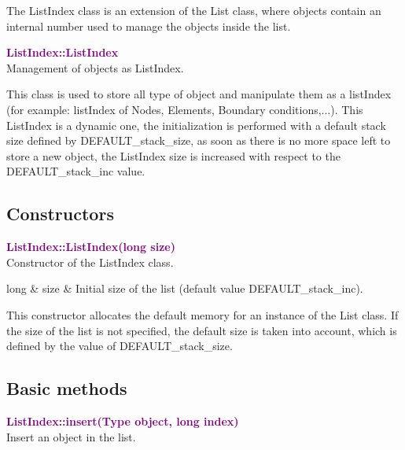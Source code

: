 The ListIndex class is an extension of the List class, where objects contain an internal number used to manage the objects inside the list.

\textcolor{purple}{\textbf{ListIndex::ListIndex}}\label{ListIndex::ListIndex}\\
Management of objects as ListIndex.

This class is used to store all type of object and manipulate them as a listIndex (for example: listIndex of Nodes, Elements, Boundary conditions,...).
This ListIndex is a dynamic one, the initialization is performed with a default stack size defined by DEFAULT\_stack\_size, as soon as there is no more space left to store a new object,
the ListIndex size is increased with respect to the DEFAULT\_stack\_inc value.

\subsection{Constructors}

\textcolor{purple}{\textbf{ListIndex::ListIndex(long size)}}\label{ListIndex::ListIndex(long size)}\\
Constructor of the ListIndex class.

\begin{tcolorbox}[width=\textwidth,myArgs,tabularx={ll|R}]
long & size & Initial size of the list (default value DEFAULT\_stack\_inc).
\end{tcolorbox}

This constructor allocates the default memory for an instance of the List class.
If the size of the list is not specified, the default size is taken into account, which is defined by the value of DEFAULT\_stack\_size.

\subsection{Basic methods}

\textcolor{purple}{\textbf{ListIndex::insert(Type object, long index)}}\label{ListIndex::insert(Type object, long index)}\\
Insert an object in the list.

